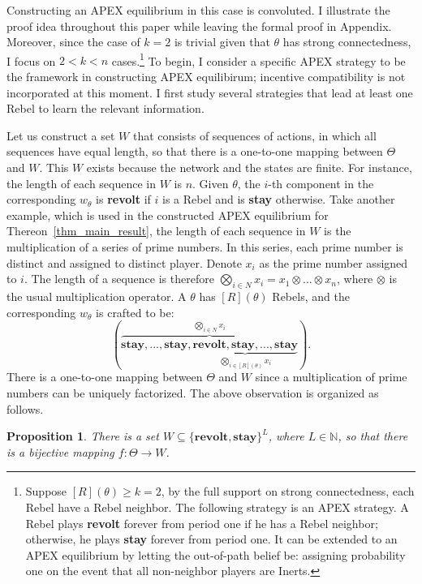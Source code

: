 \documentclass[12pt,letter]{article}
\newtheorem{proposition}{Proposition}[section]
\theoremstyle{definition}
\theoremstyle{remark}
\theoremstyle{claim}
\begin{document}
Constructing an APEX equilibrium in this case is convoluted. I illustrate the proof idea throughout this paper while leaving the formal proof in Appendix. Moreover, since the case of $k=2$ is trivial given that $\theta$ has strong connectedness, I focus on $2<k<n$ cases.\footnote{Suppose $[R](\theta)\geq k=2$, by the full support on strong connectedness, each Rebel have a Rebel neighbor. The following strategy is an APEX strategy. A Rebel plays \textbf{revolt} forever from period one if he has a Rebel neighbor; otherwise, he plays \textbf{stay} forever from period one. It can be extended to an APEX equilibrium by letting the out-of-path belief be: assigning probability one on the event that all non-neighbor players are Inerts.} To begin, I consider a specific APEX strategy to be the framework in constructing APEX equilibirum; incentive compatibility is not incorporated at this moment. I first study several strategies that lead at least one Rebel to learn the relevant information. 

Let us construct a set $W$ that consists of sequences of actions, in which all sequences have equal length, so that there is a one-to-one mapping between $\Theta$ and $W$. This $W$ exists because the network and the states are finite. For instance, the length of each sequence in $W$ is $n$. Given $\theta$, the $i$-th component in the corresponding $w_{\theta}$ is \textbf{revolt} if $i$ is a Rebel and is \textbf{stay} otherwise. Take another example, which is used in the constructed APEX equilibrium for Thereon~\ref{thm_main_result}, the length of each sequence in $W$ is the multiplication of a series of prime numbers. In this series, each prime number is distinct and assigned to distinct player. Denote $x_i$ as the prime number assigned to $i$. The length of a sequence is therefore $\bigotimes_{i\in N}x_i=x_1\otimes...\otimes x_n$, where $\otimes$ is the usual multiplication operator. A $\theta$ has $[R](\theta)$ Rebels, and the corresponding $w_{\theta}$ is crafted to be:  
\[(\overbrace{\textbf{stay},...,\textbf{stay},\underbrace{\textbf{revolt},\textbf{stay},...,\textbf{stay}}_{\bigotimes_{i\in [R](\theta)}x_i}}^{\bigotimes_{i\in N} x_i}).\]
There is a one-to-one mapping between $\Theta$ and ${W}$ since a multiplication of prime numbers can be uniquely factorized. The above observation is organized as follows.

\begin{proposition}
There is a set $W\subseteq \{\textbf{revolt},\textbf{stay}\}^L$, where $L\in \mathbb{N}$, so that there is a bijective mapping $f: \Theta \rightarrow W$.
\end{proposition}
\end{document}
